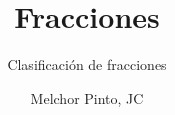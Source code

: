 \documentclass{guia}
\title{Fracciones}
\subtitle{Clasificación de fracciones}
\author{Melchor Pinto, JC}
\begin{document}
%
\begin{questions}
\questionboxed{}
\end{questions}
\end{document}
